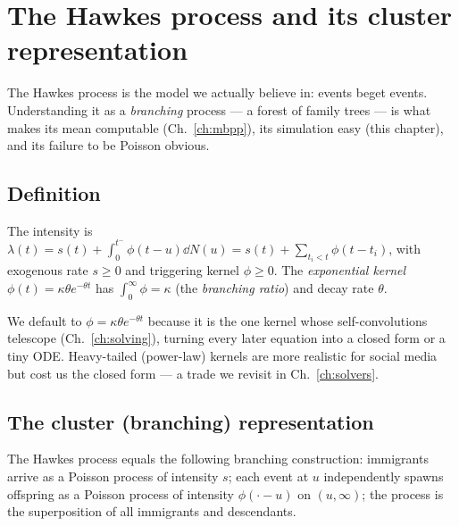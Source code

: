 \chapter{The Hawkes process and its cluster representation}
\label{ch:hawkes}

\begin{motivation}
The Hawkes process is the model we actually believe in: events beget events.
Understanding it as a \emph{branching} process --- a forest of family trees --- is
what makes its mean computable (Ch.~\ref{ch:mbpp}), its simulation easy (this
chapter), and its failure to be Poisson obvious.
\end{motivation}

\section{Definition}

\begin{model}\label{mod:ch3-hawkes}
The intensity is
$\lambda(t)=s(t)+\int_0^{t^-}\phi(t-u)\dd N(u)=s(t)+\sum_{t_i<t}\phi(t-t_i)$,
with exogenous rate $s\ge0$ and triggering kernel $\phi\ge0$. The \emph{exponential
kernel} $\phi(t)=\kappa\theta e^{-\theta t}$ has $\int_0^\infty\phi=\kappa$ (the
\emph{branching ratio}) and decay rate $\theta$.
\end{model}

\begin{whybox}
We default to $\phi=\kappa\theta e^{-\theta t}$ because it is the one kernel whose
self-convolutions telescope (Ch.~\ref{ch:solving}), turning every later equation
into a closed form or a tiny ODE. Heavy-tailed (power-law) kernels are more
realistic for social media but cost us the closed form --- a trade we revisit in
Ch.~\ref{ch:solvers}.
\end{whybox}

\section{The cluster (branching) representation}

\begin{theorem}\label{thm:ch3-cluster}
The Hawkes process equals the following branching construction: immigrants arrive
as a Poisson process of intensity $s$; each event at $u$ independently spawns
offspring as a Poisson process of intensity $\phi(\cdot-u)$ on $(u,\infty)$; the
process is the superposition of all immigrants and descendants.
\end{theorem}

